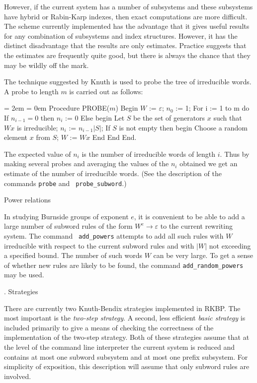 However, if the current system has a number of subsystems and these
subsystems have hybrid or Rabin-Karp indexes, then exact computations
are more difficult.  The scheme currently implemented has the
advantage that it gives useful results for any combination of
subsystems and index structures.  However, it has the distinct
disadvantage that the results are only estimates.  Practice suggests
that the estimates are frequently quite good, but there is always the
chance that they may be wildly off the mark.

The technique suggested by Knuth is used to probe the tree of
irreducible words.  A probe to length $m$ is carried out as follows:

\medskip

{\parindent = 2em \parskip = 0em \obeylines
\ind Procedure PROBE($m$)
\ind Begin
\indb  $W$ := $\varepsilon$;
\indb  $n_0$ := 1;
\smallskip
\indb  For i := 1 to m do
\indc    If $n_{i-1} = 0$ then $n_i$ := 0
\smallskip
\indc    Else begin
\indd      Let $S$ be the set of generators $x$ such that $Wx$ is irreducible;
\indd      $n_i$ := $n_{i-1}|S|$;
\smallskip
\indd      If $S$ is not empty then begin
\inde        Choose a random element $x$ from $S$;
\inde        $W$ := $Wx$
\indd      End
\indc    End
\ind End.}

\medskip

The expected value of $n_i$ is the number of irreducible words of
length $i$.  Thus by making several probes and averaging the values of
the $n_i$ obtained we get an estimate of the number of irreducible
words.  (See the description of the commands {\tt probe} and {\tt
probe\_subword}.)

\bigskip
{} Power relations

In studying Burnside groups of exponent $e$, it is convenient to be
able to add a large number of subword rules of the form $W^e\to
\varepsilon$ to the current rewriting system.  The command {\tt
add\_powers} attempts to add all such rules with $W$ irreducible with
respect to the current subword rules and with $|W|$ not exceeding a
specified bound.  The number of such words $W$ can be very large.  To
get a sense of whether new rules are likely to be found, the command
{\tt add\_random\_powers} may be used.

\bigskip
{}.  Strategies

\nobreak

There are currently two Knuth-Bendix strategies implemented in RKBP.
The most important is the {\it two-step strategy}.  A second, less
efficient {\it basic strategy} is included primarily to give a means
of checking the correctness of the implementation of the two-step
strategy.  Both of these strategies assume that at the level of the
command line interpreter the current system is reduced and contains at
most one subword subsystem and at most one prefix subsystem.  For
simplicity of exposition, this description will assume that only
subword rules are involved.


